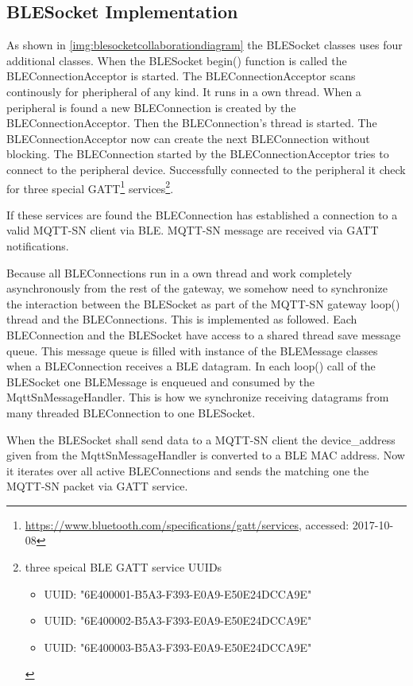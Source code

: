 \subsection{BLESocket Implementation}\label{sec:blesocketimplementation}
As shown in \autoref{img:blesocketcollaborationdiagram} the BLESocket classes uses four additional classes.
When the BLESocket begin() function is called the BLEConnectionAcceptor is started.
The BLEConnectionAcceptor scans continously for pheripheral of any kind. It runs in a own thread.
When a peripheral is found a new BLEConnection is created by the BLEConnectionAcceptor.
Then the BLEConnection's thread is started.
The BLEConnectionAcceptor now can create the next BLEConnection without blocking.
The BLEConnection started by the BLEConnectionAcceptor tries to connect to the peripheral device.
Successfully connected to the peripheral it check for three special GATT\footnote{\url{https://www.bluetooth.com/specifications/gatt/services}, accessed: 2017-10-08} services\footnote{
	three speical BLE GATT service UUIDs
	\begin{itemize}
		\item UUID: "6E400001-B5A3-F393-E0A9-E50E24DCCA9E"
		\item UUID: "6E400002-B5A3-F393-E0A9-E50E24DCCA9E"
		\item UUID: "6E400003-B5A3-F393-E0A9-E50E24DCCA9E"
	\end{itemize}}.

If these services are found the BLEConnection has established a connection to a valid MQTT-SN client via BLE.
MQTT-SN message are received via GATT notifications.

Because all BLEConnections run in a own thread and work completely asynchronously from the rest of the gateway, we somehow need to synchronize the interaction between the BLESocket as part of the MQTT-SN gateway loop() thread and the BLEConnections.
This is implemented as followed.
Each BLEConnection and the BLESocket have access to a shared thread save message queue.
This message queue is filled with instance of the BLEMessage classes when a BLEConnection receives a BLE datagram.
In each loop() call of the BLESocket one BLEMessage is enqueued and consumed by the MqttSnMessageHandler.
This is how we synchronize receiving datagrams from many threaded BLEConnection to one BLESocket.

When the BLESocket shall send data to a MQTT-SN client the device\_address given from the MqttSnMessageHandler is converted to a BLE MAC address.
Now it iterates over all active BLEConnections and sends the matching one the MQTT-SN packet via GATT service.

